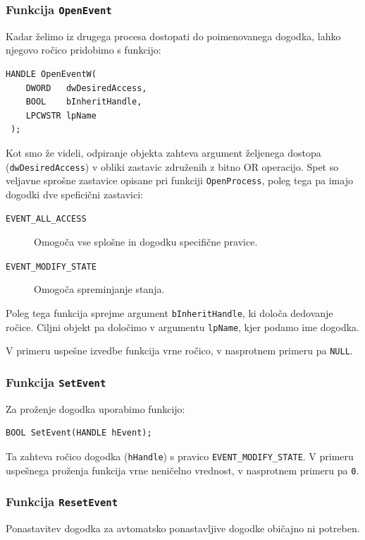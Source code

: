 \documentclass[a4paper,12pt,openright]{book}
\begin{document}
\subsubsection{Funkcija \texttt{OpenEvent}}

Kadar želimo iz drugega procesa dostopati do poimenovanega dogodka, lahko njegovo ročico pridobimo s funkcijo:
\begin{lstlisting}[style=func]
 HANDLE OpenEventW(
	DWORD   dwDesiredAccess,
	BOOL    bInheritHandle,
	LPCWSTR lpName
 );
\end{lstlisting}

Kot smo že videli, odpiranje objekta zahteva argument željenega dostopa (\texttt{dwDesiredAccess}) v obliki zastavic združenih z bitno OR operacijo.
Spet so veljavne sprošne zastavice opisane pri funkciji \texttt{OpenProcess}, poleg tega pa imajo dogodki dve speficični zastavici:
\begin{description}
	\item[\texttt{EVENT\_ALL\_ACCESS}] Omogoča vse splošne in dogodku specifične pravice.
	\item[\texttt{EVENT\_MODIFY\_STATE}] Omogoča spreminjanje stanja.
\end{description}

Poleg tega funkcija sprejme argument \texttt{bInheritHandle}, ki določa dedovanje ročice.
Ciljni objekt pa določimo v argumentu \texttt{lpName}, kjer podamo ime dogodka.

V primeru uspešne izvedbe funkcija vrne ročico, v nasprotnem primeru pa \texttt{NULL}.

\subsubsection{Funkcija \texttt{SetEvent}}

Za proženje dogodka uporabimo funkcijo:
\begin{lstlisting}[style=func]
 BOOL SetEvent(HANDLE hEvent);
\end{lstlisting}

Ta zahteva ročico dogodka (\texttt{hHandle}) s pravico \texttt{EVENT\-\_MODIFY\_STATE}.
V primeru uspešnega proženja funkcija vrne neničelno vrednost, v nasprotnem primeru pa \texttt{0}.

\subsubsection{Funkcija \texttt{ResetEvent}}

Ponastavitev dogodka za avtomatsko ponastavljive dogodke običajno ni potreben.
\end{document}

